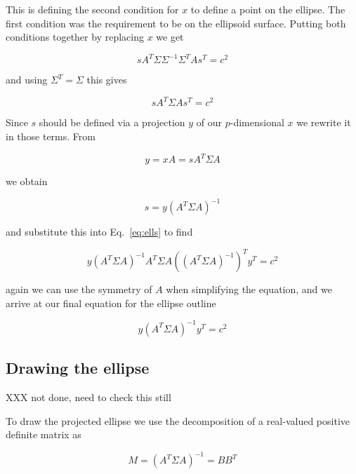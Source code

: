 \documentclass{article}
\begin{document}
This is defining the second condition for $x$ to define a point on the ellipse. The first condition was the requirement to be on the ellipsoid surface. Putting both conditions together by replacing $x$ we get

\begin{equation}
    s A^T \Sigma \Sigma^{-1} \Sigma^T A s^T = c^2
\end{equation}

and using $\Sigma^T = \Sigma$ this gives

\begin{equation}
    s A^T \Sigma A s^T = c^2
        \label{eq:ells}

\end{equation}

Since $s$ should be defined via a projection $y$ of our $p$-dimensional $x$ we rewrite it in those terms. From

\begin{equation}
    y = x A = s A^T \Sigma A
\end{equation}

we obtain

\begin{equation}
    s = y (A^T \Sigma A)^{-1}
\end{equation}

and substitute this into Eq.~\ref{eq:ells} to find

\begin{equation}
    y (A^T \Sigma A)^{-1} A^T \Sigma A ((A^T \Sigma A)^{-1})^T y^T = c^2
\end{equation}

again we can use the symmetry of $A$ when simplifying the equation, and we arrive at our final equation for the ellipse outline

\begin{equation}
    y (A^T \Sigma A)^{-1} y^T = c^2
    \label{eq:elly}
\end{equation}

\subsection{Drawing the ellipse}

XXX not done, need to check this still

To draw the projected ellipse we use the decomposition of a real-valued positive definite matrix as

\begin{equation}
    M = (A^T \Sigma A)^{-1} = B B^T
\end{equation}
\end{document}
